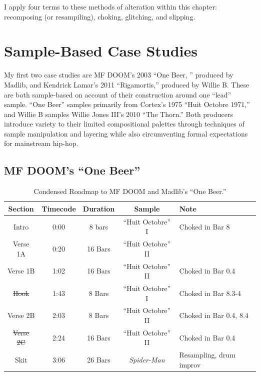 I apply four terms to these methods of alteration within this chapter: recomposing (or resampiling), choking, glitching, and slipping.
\clearpage

\singlespacing
\section{Sample-Based Case Studies}
My first two case studies are MF DOOM's 2003 ``One Beer, '' produced by Madlib, and Kendrick Lamar's 2011 ``Rigamortis,'' produced by Willie B. These are both sample-based on account of their construction around one ``lead'' sample. ``One Beer'' samples primarily from Cortex's 1975 ``Huit Octobre 1971,'' and Willie B samples Willie Jones III's 2010 ``The Thorn.'' Both producers introduce variety to their limited compositional palettes through techniques of sample manipulation and layering while also circumventing formal expectations for mainstream hip-hop.

\subsection*{\centering MF DOOM's ``One Beer''}

    \begin{table}[ht]
        \centering
            \begin{tabular}{|c|c|c|c|l|}
                 \hline
                  Section & Timecode & Duration & Sample & Note \\ \hline
                  Intro & 0:00 & 8 bars & ``Huit Octobre'' I & Choked in Bar 8  \\ \hline
                  Verse 1A & 0:20 & 16 Bars & ``Huit Octobre'' II &  \\ \hline
                  Verse 1B & 1:02 & 16 Bars & ``Huit Octobre'' II & Choked in Bar 0.4 \\ \hline
                  \sout{Hook} & 1:43 & 8 Bars & ``Huit Octobre'' I & Choked in Bar 8.3-4 \\ \hline
                  Verse 2B & 2:03 & 8 Bars & ``Huit Octobre'' II & Choked in Bar 0.4, 8.4 \\ \hline
                  \sout{Verse 2C} & 2:24 & 16 Bars & ``Huit Octobre'' II & Choked in Bar 0.4 \\ \hline
                  Skit & 3:06 & 26 Bars & \textit{Spider-Man} & Resampling, drum improv \\ \hline
             \end{tabular}
        \caption{Condensed Roadmap to MF DOOM and Madlib's ``One Beer.''}
        \label{tab:onebeer}
    \end{table}

